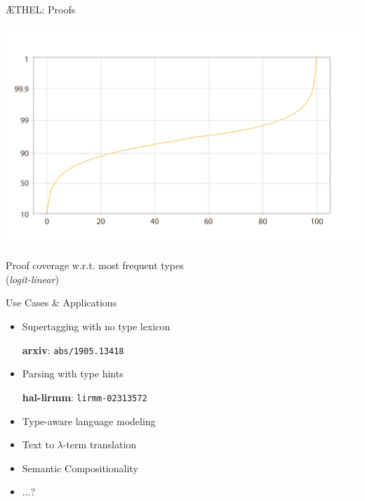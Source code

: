 \documentclass{beamer}
\begin{document}
{\begin{frame}{\AE THEL: Proofs}
	\begin{minipage}{0.75\textwidth}	\includegraphics[width=\textwidth,height=0.6\textheight,keepaspectratio]{sentence_covr3.png}\end{minipage}%
	\begin{minipage}{0.25\textwidth}
	\scriptsize{Proof coverage w.r.t. most frequent types\\
	(\textit{logit-linear})}
	\end{minipage}
	
\end{frame}
}

\begin{frame}{Use Cases \& Applications}
	\begin{itemize}
	\item {Supertagging with no type lexicon\\
	\begin{flushright}
	\textbf{arxiv}: \quad \texttt{abs/1905.13418}	
	\end{flushright}
	}
	\item {Parsing with type hints
	\begin{flushright}
	\textbf{hal-lirmm}: \quad \texttt{lirmm-02313572}	
	\end{flushright}
	}
	\item {Type-aware language modeling}
	\item {Text to $\lambda$-term translation}
	\item {Semantic Compositionality}
	\item {...?}
	\end{itemize}
	
\end{frame}
\end{document}
